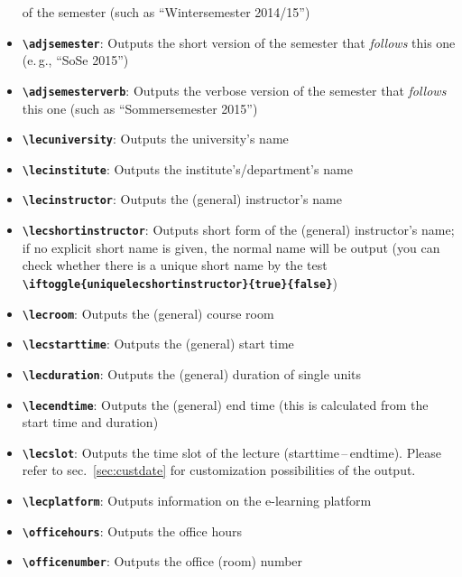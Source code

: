 \documentclass[english]{article}
\newcommand*\jmacro[1]{\textbf{\texttt{#1}}}
\newcommand*\jcsmacro[1]{\jmacro{\textbackslash{#1}}}
\newcommand*\jparam[1]{\angus #1\angud}
\begin{document}
\begin{itemize}
of the semester (such as ``Winter\-semester 2014/15'')
\item \jcsmacro{adjsemester}: Outputs the short version of
the semester that \emph{follows} this one (e.\,g., ``SoSe 2015'')
\item \jcsmacro{adjsemesterverb}: Outputs the verbose version
of the semester that \emph{follows} this one (such as ``Sommer\-semester 2015'')
\item \jcsmacro{lecuniversity}: Outputs the university's name
\item \jcsmacro{lecinstitute}: Outputs the institute's/department's name
\item \jcsmacro{lecinstructor}: Outputs the (general) instructor's name
\item \jcsmacro{lecshortinstructor}: Outputs short form of the (general) instructor's name;
if no explicit short name is given, the normal name will be output (you can check whether
there is a unique short name by the test
\jcsmacro{iftoggle\{uniquelecshortinstructor\}\{\jparam{true}\}\{\jparam{false}\}})
\item \jcsmacro{lecroom}: Outputs the (general) course room
\item \jcsmacro{lecstarttime}: Outputs the (general) start time
\item \jcsmacro{lecduration}: Outputs the (general) duration of single units
\item \jcsmacro{lecendtime}: Outputs the (general) end time (this is calculated from the start time and duration)
\item \jcsmacro{lecslot}: Outputs the time slot of the lecture (starttime\,--\,endtime). Please refer to
      sec.~\ref{sec:custdate} for customization possibilities of the output.
\item \jcsmacro{lecplatform}: Outputs information on the
e-learning platform
\item \jcsmacro{officehours}: Outputs the office hours
\item \jcsmacro{officenumber}: Outputs the office (room) number
\end{itemize}
\end{document}

